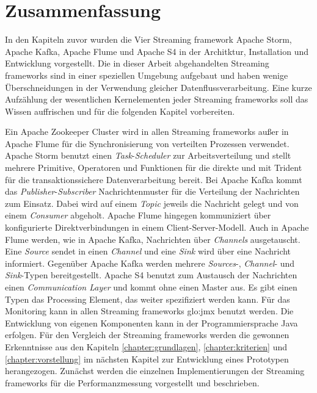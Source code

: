 \section{Zusammenfassung}

In den Kapiteln zuvor wurden die Vier Streaming framework Apache Storm, Apache Kafka, Apache Flume und Apache S4 in der Architktur, Installation und Entwicklung vorgestellt. Die in dieser Arbeit abgehandelten Streaming frameworks sind in einer speziellen Umgebung aufgebaut und haben wenige Überschneidungen in der Verwendung gleicher Datenflussverarbeitung. Eine kurze Aufzählung der wesentlichen Kernelementen jeder Streaming frameworks soll das Wissen auffrischen und für die folgenden Kapitel vorbereiten.

Ein Apache Zookeeper Cluster wird in allen Streaming frameworks außer in Apache Flume für die Synchronisierung von verteilten Prozessen verwendet. 
Apache Storm benutzt einen \textit{Task}-\textit{Scheduler} zur Arbeitsverteilung und stellt mehrere Primitive, Operatoren und Funktionen für die direkte und mit Trident für die transaktionssichere Datenverarbeitung bereit. Bei Apache Kafka kommt das \textit{Publisher}-\textit{Subscriber} Nachrichtenmuster für die Verteilung der Nachrichten zum Einsatz. Dabei wird auf einem \textit{Topic} jeweils die Nachricht gelegt und von einem \textit{Consumer} abgeholt. Apache Flume hingegen kommuniziert über konfigurierte Direktverbindungen in einem Client-Server-Modell. Auch in Apache Flume werden, wie in Apache Kafka, Nachrichten über \textit{Channels} ausgetauscht. Eine \textit{Source} sendet in einen \textit{Channel} und eine \textit{Sink} wird über eine Nachricht informiert. Gegenüber Apache Kafka werden mehrere \textit{Sources}-, \textit{Channel}- und \textit{Sink}-Typen bereitgestellt. Apache S4 benutzt zum Austausch der Nachrichten einen \textit{Communication Layer} und kommt ohne einen Master aus. Es gibt einen Typen das Processing Element, das weiter spezifiziert werden kann. Für das Monitoring kann in allen Streaming frameworks \gls{glo:jmx} benutzt werden. Die Entwicklung von eigenen Komponenten kann in der Programmiersprache Java erfolgen. Für den Vergleich der Streaming frameworks werden die gewonnen Erkenntnisse aus den Kapiteln \ref{chapter:grundlagen}, \ref{chapter:kriterien} und \ref{chapter:vorstellung} im nächsten Kapitel zur Entwicklung eines Prototypen herangezogen. Zunächst werden die einzelnen Implementierungen der Streaming frameworks für die Performanzmessung vorgestellt und beschrieben.